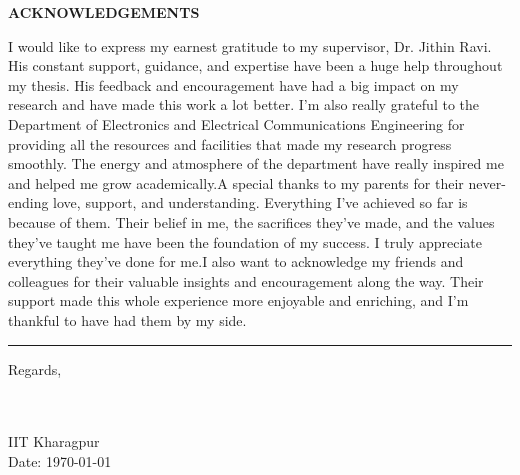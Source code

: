 \thispagestyle{plain}

\begin{center}
 \Large {\bf \uppercase{Acknowledgements}}
\end{center}

\vspace{3\baselineskip}

\noindent
I would like to express my earnest gratitude to my supervisor, Dr. Jithin Ravi. His constant support, guidance, and expertise have been a huge help throughout my thesis. His feedback and encouragement have had a big impact on my research and have made this work a lot better. I’m also really grateful to the Department of Electronics and Electrical Communications Engineering for providing all the resources and facilities that made my research progress smoothly. The energy and atmosphere of the department have really inspired me and helped me grow academically.A special thanks to my parents for their never-ending love, support, and understanding. Everything I’ve achieved so far is because of them. Their belief in me, the sacrifices they've made, and the values they’ve taught me have been the foundation of my success. I truly appreciate everything they’ve done for me.I also want to acknowledge my friends and colleagues for their valuable insights and encouragement along the way. Their support made this whole experience more enjoyable and enriching, and I’m thankful to have had them by my side.
\noindent
\vspace{2\baselineskip} \\
\rule[0.5ex]{3cm}{0.5pt}

\vspace{1em}

\noindent
Regards,

\vspace{1em}

\noindent\textbf{\myname} \\
\noindent\textbf{\myrollno}\\
IIT Kharagpur \\
Date: \today

